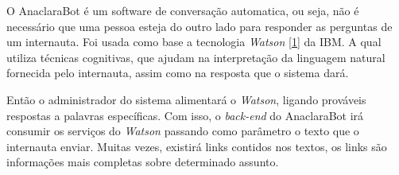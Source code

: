 \par O AnaclaraBot é um software de conversação automatica, ou seja, não é necessário que uma pessoa esteja do outro lado para responder as perguntas de um internauta. Foi usada como base a tecnologia \emph{Watson} \hyperref[watson]{[1]} da IBM. A qual utiliza técnicas cognitivas, que ajudam na interpretação da linguagem natural fornecida pelo internauta, assim como na resposta que o sistema dará.

\par Então o administrador do sistema alimentará o \emph{Watson}, ligando prováveis respostas a palavras específicas. Com isso, o \emph{back-end} do AnaclaraBot irá consumir os serviços do \emph{Watson} passando como parâmetro o texto que o internauta enviar. Muitas vezes, existirá links contidos nos textos, os links são informações mais completas sobre determinado assunto.
